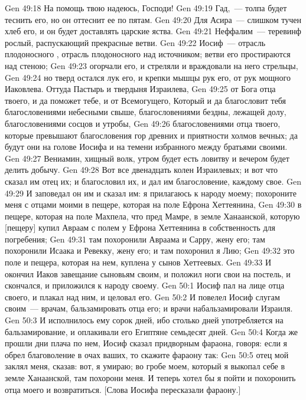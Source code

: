 \vs Gen 49:18 На помощь твою надеюсь, Господи!
\rsbpar\vs Gen 49:19 Гад,~--- толпа будет теснить его, но он оттеснит ее по пятам.
\rsbpar\vs Gen 49:20 Для Асира~--- слишком тучен хлеб его, и он будет доставлять царские яства.
\rsbpar\vs Gen 49:21 Неффалим~--- теревинф рослый, распускающий прекрасные ветви.
\rsbpar\vs Gen 49:22 Иосиф~--- отрасль плодоносного , отрасль плодоносного  над источником; ветви его простираются над стеною;
\vs Gen 49:23 огорчали его, и стреляли и враждовали на него стрельцы,
\vs Gen 49:24 но тверд остался лук его, и крепки мышцы рук его, от рук мощного  Иаковлева. Оттуда Пастырь и твердыня Израилева,
\vs Gen 49:25 от Бога отца твоего,  и да поможет тебе, и от Всемогущего, Который и да благословит тебя благословениями небесными свыше, благословениями бездны, лежащей долу, благословениями сосцов и утробы,
\vs Gen 49:26 благословениями отца твоего, которые превышают благословения гор древних и приятности холмов вечных; да будут они на голове Иосифа и на темени избранного между братьями своими.
\rsbpar\vs Gen 49:27 Вениамин, хищный волк, утром будет есть ловитву и вечером будет делить добычу.
\rsbpar\vs Gen 49:28 Вот все двенадцать колен Израилевых; и вот что сказал им отец их; и благословил их, и дал им благословение, каждому свое.
\vs Gen 49:29 И заповедал он им и сказал им: я прилагаюсь к народу моему; похороните меня с отцами моими в пещере, которая на поле Ефрона Хеттеянина,
\vs Gen 49:30 в пещере, которая на поле Махпела, что пред Мамре, в земле Ханаанской, которую [пещеру] купил Авраам с полем у Ефрона Хеттеянина в собственность для погребения;
\vs Gen 49:31 там похоронили Авраама и Сарру, жену его; там похоронили Исаака и Ревекку, жену его; и там похоронил я Лию;
\vs Gen 49:32 это поле и пещера, которая на нем, куплена у сынов Хеттеевых.
\vs Gen 49:33 И окончил Иаков завещание сыновьям своим, и положил ноги свои на постель, и скончался, и приложился к народу своему.
\vs Gen 50:1 Иосиф пал на лице отца своего, и плакал над ним, и целовал его.
\vs Gen 50:2 И повелел Иосиф слугам своим~--- врачам, бальзамировать отца его; и врачи набальзамировали Израиля.
\vs Gen 50:3 И исполнилось ему сорок дней, ибо столько дней употребляется на бальзамирование, и оплакивали его Египтяне семьдесят дней.
\vs Gen 50:4 Когда же прошли дни плача по нем, Иосиф сказал придворным фараона, говоря: если я обрел благоволение в очах ваших, то скажите фараону так:
\vs Gen 50:5 отец мой заклял меня, сказав: вот, я умираю; во гробе моем, который я выкопал себе в земле Ханаанской, там похорони меня. И теперь хотел бы я пойти и похоронить отца моего и возвратиться. [Слова Иосифа пересказали фараону.]
